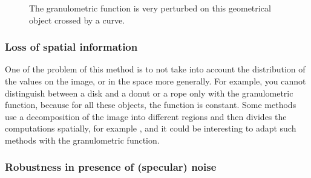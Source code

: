 \begin{figure}[!ht]
    \centering
    \qquad\qquad\qquad
    \caption{The granulometric function is very perturbed on this geometrical object crossed by a curve.}
	\label{device9-6}
\end{figure}

\subsubsection{Loss of spatial information}

One of the problem of this method is to not take into account the distribution of the values on the image, or in the space more generally. For example, you cannot distinguish between a disk and a donut or a rope only with the granulometric function, because for all these objects, the function is constant. Some methods use a decomposition of the image into different regions and then divides the computations spatially, for example \cite{spacial-decompo}, and it could be interesting to adapt such methods with the granulometric function.

\subsubsection{Robustness in presence of (specular) noise}

